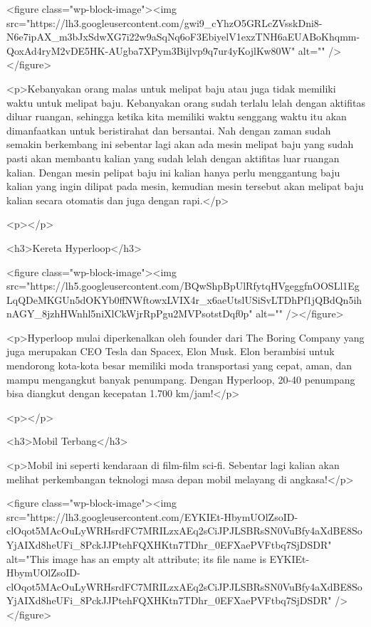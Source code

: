 <figure class="wp-block-image"><img src="https://lh3.googleusercontent.com/gwi9_cYhzO5GRLcZVsskDni8-N6e7ipAX_m3bJxSdwXG7i22w9aSqNq6oF3EbiyelV1exzTNH6aEUABoKhqmm-QoxAd4ryM2vDE5HK-AUgba7XPym3Bijlvp9q7ur4yKojlKw80W" alt="" /></figure>



<p>Kebanyakan orang malas untuk melipat baju atau juga tidak memiliki waktu untuk melipat baju. Kebanyakan orang sudah terlalu lelah dengan aktifitas diluar ruangan, sehingga ketika kita memiliki waktu senggang waktu itu akan dimanfaatkan untuk beristirahat dan bersantai. Nah dengan zaman sudah semakin berkembang ini sebentar lagi akan ada mesin melipat baju yang sudah pasti akan membantu kalian yang sudah lelah dengan aktifitas luar ruangan kalian. Dengan mesin pelipat baju ini kalian hanya perlu menggantung baju kalian yang ingin dilipat pada mesin, kemudian mesin tersebut akan melipat baju kalian secara otomatis dan juga dengan rapi.</p>



<p></p>



<h3>Kereta Hyperloop</h3>



<figure class="wp-block-image"><img src="https://lh5.googleusercontent.com/BQwShpBpUlRfytqHVgeggfnOOSLl1EgLqQDeMKGUn5dOKYb0ffNWftowxLVIX4r_x6aeUtslUSiSvLTDhPf1jQBdQn5ihnAGY_8jzhHWnhl5niXlCkWjrRpPgu2MVPsotstDqf0p" alt="" /></figure>



<p>Hyperloop mulai diperkenalkan oleh founder dari The Boring Company yang juga merupakan CEO Tesla dan Spacex, Elon Musk. Elon berambisi untuk mendorong kota-kota besar memiliki moda transportasi yang cepat, aman, dan mampu mengangkut banyak penumpang. Dengan Hyperloop, 20-40 penumpang bisa diangkut dengan kecepatan 1.700 km/jam!</p>



<p></p>



<h3>Mobil Terbang</h3>



<p>Mobil ini seperti kendaraan di film-film sci-fi. Sebentar lagi kalian akan melihat perkembangan teknologi masa depan mobil melayang di angkasa!</p>



<figure class="wp-block-image"><img src="https://lh3.googleusercontent.com/EYKIEt-HbymUOlZsoID-clOqot5MAcOuLyWRHsrdFC7MRILzxAEq2sCiJPJLSBRsSN0VuBfy4aXdBE8SoYjAIXd8heUFi_8PckJJPtehFQXHKtn7TDhr_0EFXaePVFtbq7SjDSDR" alt="This image has an empty alt attribute; its file name is EYKIEt-HbymUOlZsoID-clOqot5MAcOuLyWRHsrdFC7MRILzxAEq2sCiJPJLSBRsSN0VuBfy4aXdBE8SoYjAIXd8heUFi_8PckJJPtehFQXHKtn7TDhr_0EFXaePVFtbq7SjDSDR" /></figure>



